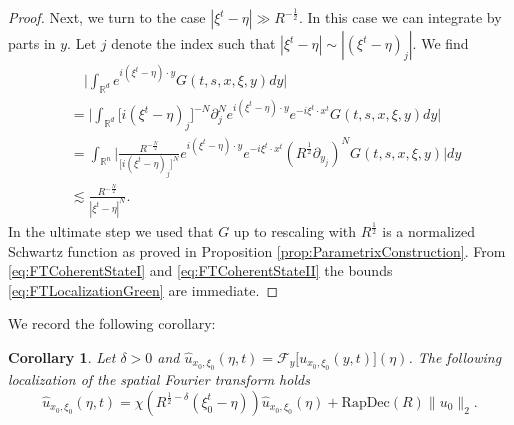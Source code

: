 \documentclass{amsart}
\newtheorem{corollary}[theorem]{Corollary}
\theoremstyle{definition}
\newcommand{\R}{\mathbb{R}}
\begin{document}
\begin{proof}
Next, we turn to the case $|\xi^t - \eta| \gg R^{-\frac{1}{2}}$. In this case we can integrate by parts in $y$. Let $j$ denote the index such that $| \xi^t - \eta| \sim |(\xi^t - \eta)_j|$. We find
\begin{equation}
\label{eq:FTCoherentStateII}
\begin{split}
&\quad \big| \int_{\R^d} e^{i ( \xi^t - \eta) \cdot y} G(t,s,x,\xi,y) dy \big| \\
&= \big| \int_{\R^d} \big[ i( \xi^t - \eta)_j \big]^{-N} \partial_j^N e^{i(\xi^t - \eta) \cdot y} e^{- i \xi^t \cdot x^t} G(t,s,x,\xi,y) dy \big| \\
&= \int_{\R^n} \big| \frac{R^{-\frac{N}{2}}}{\big[ i (\xi^t - \eta)_j \big]^N} e^{i(\xi^t - \eta) \cdot y} e^{-i \xi^t \cdot x^t} (R^{\frac{1}{2}} \partial_{y_j})^N G(t,s,x,\xi,y) \big| dy \\
&\lesssim \frac{R^{-\frac{N}{2}}}{|\xi^t - \eta|^N}.
\end{split}
\end{equation}
In the ultimate step we used that $G$ up to rescaling with $R^{\frac{1}{2}}$ is a normalized Schwartz function as proved in Proposition \ref{prop:ParametrixConstruction}. From \eqref{eq:FTCoherentStateI} and \eqref{eq:FTCoherentStateII} the bounds \eqref{eq:FTLocalizationGreen} are immediate.
\end{proof}

We record the following corollary:
\begin{corollary}
\label{cor:FrequencyLocalization}
Let $\delta > 0$ and $\hat{u}_{x_0,\xi_0}(\eta,t) = \mathcal{F}_y \big[ u_{x_0,\xi_0}(y,t) \big](\eta )$. The following localization of the spatial Fourier transform holds
\begin{equation}
\label{eq:FrequencyLocalizationWavePacket}
\hat{u}_{x_0,\xi_0}(\eta,t) = \chi(R^{\frac{1}{2} - \delta} (\xi_0^t - \eta)) \hat{u}_{x_0,\xi_0}(\eta) + \text{RapDec}(R) \| u_0 \|_2.
\end{equation}
\end{corollary}
\end{document}

